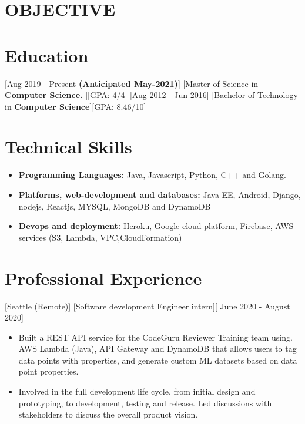 \documentclass{article}
\begin{document}

\makecvtitle %
\section{OBJECTIVE}
\section{Education}
[\normalfont{}Aug 2019 - Present \textbf{(Anticipated May-2021)}]
[\normalfont{}Master of Science in \textbf{Computer Science. }][GPA: 4/4]
\vspace{0.1cm}
[\normalfont{}Aug 2012 - Jun 2016]
[\normalfont{}Bachelor of Technology in \textbf{Computer Science}][GPA: 8.46/10]
\vspace{0.25cm}
\section{Technical Skills}
\begin{itemize}
\item \textbf{Programming Languages:} Java, Javascript, Python, C++ and Golang.
\item \textbf{Platforms, web-development and databases:} Java EE, Android, Django, nodejs, Reactjs, MYSQL, MongoDB and DynamoDB
\item \textbf{Devops and deployment:} Heroku, Google cloud platform, Firebase, AWS services (S3, Lambda, VPC,CloudFormation)
\end{itemize}
 
 
\section{Professional Experience}

[\normalfont{}Seattle (Remote)]
[Software development Engineer intern][\normalfont{} June 2020 - August 2020]
\vspace{0.25cm}
\begin{itemize}
\item Built a REST API service for the CodeGuru Reviewer Training team using. AWS Lambda (Java), API Gateway and DynamoDB that allows users to tag data points with properties, and generate custom ML datasets based on data point properties.
\item Involved in the full development life cycle, from initial design and prototyping, to development, testing and release. Led discussions with stakeholders to discuss the overall product vision.
\end{itemize}
\end{document}

